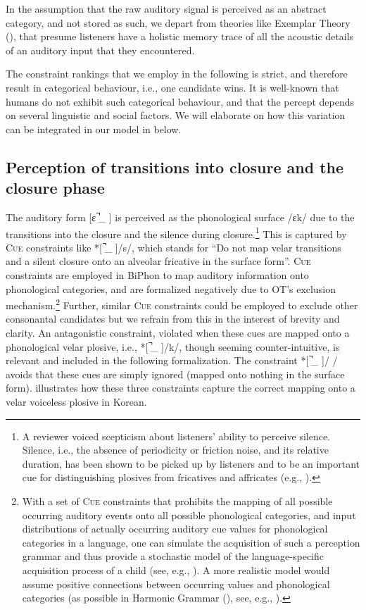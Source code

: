 \documentclass[output=paper,colorlinks,citecolor=brown]{langscibook}
\begin{document}
In the assumption that the raw auditory signal is perceived as an abstract category, and not stored as such, we depart from theories like Exemplar Theory (\cite{Pierrehumbert2001}), that presume listeners have a holistic memory trace of all the acoustic details of an auditory input that they encountered. 

The constraint rankings that we employ in the following is strict, and therefore result in categorical behaviour, i.e., one candidate wins. It is well-known that humans do not exhibit such categorical behaviour, and that the percept depends on several linguistic and social factors. We will elaborate on how this variation can be integrated in our model in  below.


\subsection{Perception of transitions into closure and the closure phase}\label{hamann:percep}

The auditory form [ɛ  ̚\_ ] is perceived as the phonological surface /ɛk/ due to the transitions into the closure and the silence during closure.\footnote{A reviewer voiced scepticism about listeners' ability to perceive silence. Silence, i.e., the absence of periodicity or friction noise, and its relative duration, has been shown to be picked up by listeners and to be an important cue for distinguishing plosives from fricatives and affricates (e.g., \cite{Reppetal1978,Dormanetal1979}).}
This is captured by C\textsc{ue} constraints like *[  ̚\_ ]/s/, which stands for “Do not map velar transitions and a silent closure onto an alveolar fricative in the surface form”. \textsc{Cue} constraints are employed in BiPhon to map auditory information onto phonological categories, and are formalized negatively due to OT's exclusion mechanism.\footnote{With a set of C\textsc{ue} constraints that prohibits the mapping of all possible occurring auditory events onto all possible phonological categories, and input distributions of actually occurring auditory cue values for phonological categories in a language, one can simulate the acquisition of such a perception grammar and thus provide a stochastic model of the language-specific acquisition process of a child (see, e.g., \cite{EscuderoBoersma2003}). A more realistic model would assume positive connections between occurring values and phonological categories (as possible in Harmonic Grammar (\cite{Legrendreetal1990}), see, e.g., \cite{ZhouHamann2024}).} Further, similar \textsc{Cue} constraints could be employed to exclude other consonantal candidates but we refrain from this in the interest of brevity and clarity. An antagonistic constraint, violated when these cues are mapped onto a phonological velar plosive, i.e., *[ ̚\_ ]/k/, though seeming counter-intuitive, is relevant and included in the following formalization. 
The constraint *[ ̚\_ ]/ / avoids that these cues are simply ignored (mapped onto nothing in the surface form).  illustrates how these three constraints capture the correct mapping onto a velar voiceless plosive in Korean.
\end{document}
